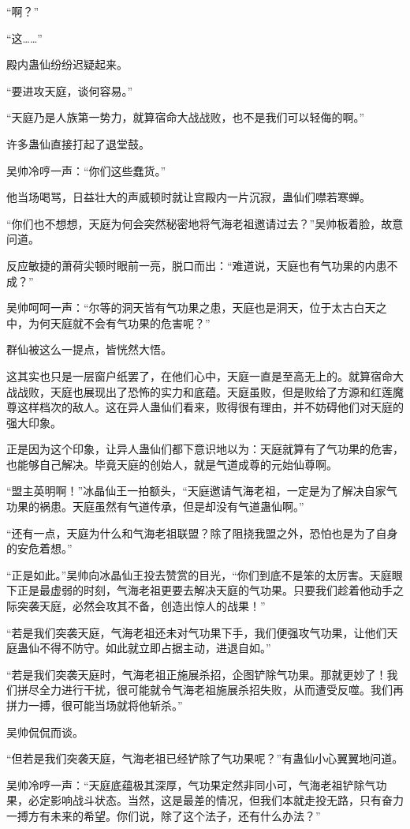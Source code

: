 \begin{this_body}
“啊？”

“这……”

殿内蛊仙纷纷迟疑起来。

“要进攻天庭，谈何容易。”

“天庭乃是人族第一势力，就算宿命大战战败，也不是我们可以轻侮的啊。”

许多蛊仙直接打起了退堂鼓。

吴帅冷哼一声：“你们这些蠢货。”

他当场喝骂，日益壮大的声威顿时就让宫殿内一片沉寂，蛊仙们噤若寒蝉。

“你们也不想想，天庭为何会突然秘密地将气海老祖邀请过去？”吴帅板着脸，故意问道。

反应敏捷的萧荷尖顿时眼前一亮，脱口而出：“难道说，天庭也有气功果的内患不成？”

吴帅呵呵一声：“尔等的洞天皆有气功果之患，天庭也是洞天，位于太古白天之中，为何天庭就不会有气功果的危害呢？”

群仙被这么一提点，皆恍然大悟。

这其实也只是一层窗户纸罢了，在他们心中，天庭一直是至高无上的。就算宿命大战战败，天庭也展现出了恐怖的实力和底蕴。天庭虽败，但是败给了方源和红莲魔尊这样档次的敌人。这在异人蛊仙们看来，败得很有理由，并不妨碍他们对天庭的强大印象。

正是因为这个印象，让异人蛊仙们都下意识地以为：天庭就算有了气功果的危害，也能够自己解决。毕竟天庭的创始人，就是气道成尊的元始仙尊啊。

“盟主英明啊！”冰晶仙王一拍额头，“天庭邀请气海老祖，一定是为了解决自家气功果的祸患。天庭虽然有气道传承，但是却没有气道蛊仙啊。”

“还有一点，天庭为什么和气海老祖联盟？除了阻挠我盟之外，恐怕也是为了自身的安危着想。”

“正是如此。”吴帅向冰晶仙王投去赞赏的目光，“你们到底不是笨的太厉害。天庭眼下正是最虚弱的时刻，气海老祖更要去解决天庭的气功果。只要我们趁着他动手之际突袭天庭，必然会攻其不备，创造出惊人的战果！”

“若是我们突袭天庭，气海老祖还未对气功果下手，我们便强攻气功果，让他们天庭蛊仙不得不防守。如此就立即占据主动，进退自如。”

“若是我们突袭天庭时，气海老祖正施展杀招，企图铲除气功果。那就更妙了！我们拼尽全力进行干扰，很可能就令气海老祖施展杀招失败，从而遭受反噬。我们再拼力一搏，很可能当场就将他斩杀。”

吴帅侃侃而谈。

“但若是我们突袭天庭，气海老祖已经铲除了气功果呢？”有蛊仙小心翼翼地问道。

吴帅冷哼一声：“天庭底蕴极其深厚，气功果定然非同小可，气海老祖铲除气功果，必定影响战斗状态。当然，这是最差的情况，但我们本就走投无路，只有奋力一搏方有未来的希望。你们说，除了这个法子，还有什么办法？”


\end{this_body}
